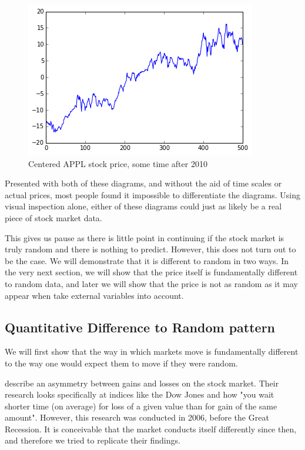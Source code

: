 \documentclass{report}
\begin{document}
\begin{figure}[H]
	\caption{Centered APPL stock price, some time after 2010}
	\centerline{\includegraphics[width=\textwidth]{vis/appl.png}}
	\label{fig:appl-process}
\end{figure}

Presented with both of these diagrams, and without the aid of time scales or actual prices, most people found it impossible to differentiate the diagrams. Using visual inspection alone, either of these diagrams could just as likely be a real piece of stock market data.

This gives us pause as there is little point in continuing if the stock market is truly random and there is nothing to predict. However, this does not turn out to be the case. We will demonstrate that it is different to random in two ways. In the very next section, we will show that the price itself is fundamentally different to random data, and later we will show that the price is not as random as it may appear when take external variables into account.

\subsection{Quantitative Difference to Random pattern}

We will first show that the way in which markets move is fundamentally different to the way one would expect them to move if they were random.

\citet{karpio2007gain} describe an asymmetry between gains and losses on the stock market. Their research looks specifically at indices like the Dow Jones and how "you wait shorter time (on average) for loss of a given value than for gain of the same amount". However, this research was conducted in 2006, before the Great Recession. It is conceivable that the market conducts itself differently since then, and therefore we tried to replicate their findings.
\end{document}
